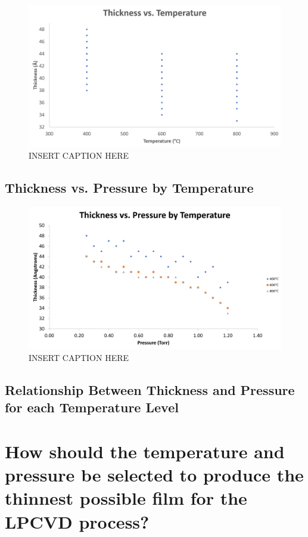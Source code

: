 \documentclass[letterpaper]{article}
\begin{document}
    \begin{figure}[H]
      \centering
      \includegraphics[width=\textwidth]{thiccvstemp.png}
      \caption{INSERT CAPTION HERE}
      \label{thiccvstemp}
    \end{figure}

  \subsection{Thickness vs. Pressure by Temperature}

    \begin{figure}[H]
      \centering
      \includegraphics[width=\textwidth]{thiccvspressurebytemp.png}
      \caption{INSERT CAPTION HERE}
      \label{thiccvspressurebytemp}
    \end{figure}


  \subsection{Relationship Between Thickness and Pressure for each Temperature Level}

\section{How should the temperature and pressure be selected to produce the thinnest possible film for the LPCVD
process?}
\end{document}
